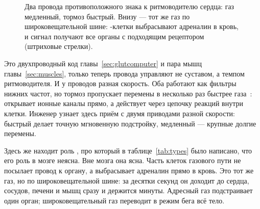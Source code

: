 \begin{figure}[t]
\centering
{}
\caption{Два провода противоположного знака к ритмоводителю сердца: газ  медленный, тормоз  быстрый. Внизу --- тот же газ по широковещательной шине: -клетки выбрасывают адреналин в кровь, и сигнал получают все органы с подходящим рецептором (штриховые стрелки).}
\label{fig:gasbrake}
\end{figure}

Это двухпроводный код главы~\ref{sec:glutcomputer} и пара мышц главы~\ref{sec:muscles}, только теперь провода управляют не суставом, а темпом ритмоводителя. И у проводов разная скорость. Оба работают как фильтры нижних частот, но тормоз пропускает перемены в несколько раз быстрее газа~\cite{Berger1989}:  открывает ионные каналы прямо, а  действует через цепочку реакций внутри клетки. Инженер узнает здесь приём с двумя приводами разной скорости: быстрый делает точную мгновенную подстройку, медленный --- крупные долгие перемены.

Здесь же находит роль , про который в таблице~\ref{tab:types} было написано, что его роль в мозге неясна. Вне мозга она ясна. Часть клеток газового пути не посылает провод к органу, а выбрасывает адреналин прямо в кровь. Это тот же газ, но по широковещательной шине: за десятки секунд он доходит до сердца, сосудов, печени и мышц сразу и держится минуты. Адресный газ  подстраивает один орган; широковещательный газ  переводит в режим бега всё тело.

